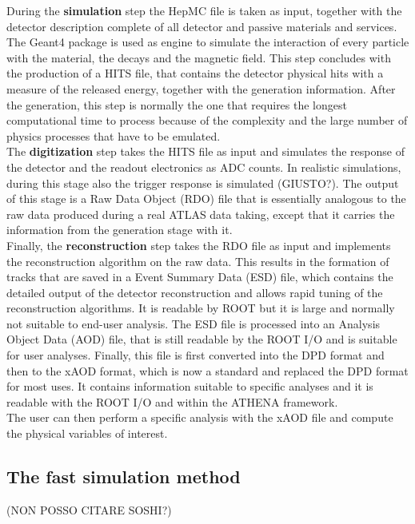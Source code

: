 \documentclass[a4paper,twoside,12pt]{article}
\begin{document}
During the \textbf{simulation} step the HepMC file is taken as input, together with
the detector description complete of all detector and passive materials and services. 
The Geant4 package\cite{Geant4} is used as
engine to simulate the interaction of every particle with the material, the decays and the
magnetic field. This
step concludes with the production of a HITS file, that contains the detector physical hits
with a measure of the released energy, together with the generation information. After
the generation, this step 
is normally the one that requires the longest computational time to process because of the
complexity and the large number of physics processes that have to be emulated.\\

The \textbf{digitization} step takes the HITS file as input and simulates the response of the 
detector and the readout electronics as ADC counts. In realistic simulations, during this
stage also the trigger response is simulated (GIUSTO?). The output of this stage is a Raw Data
Object (RDO) file that is essentially analogous to the raw data produced during a real 
ATLAS data taking, except that it carries the information from the generation stage with it.\\

Finally, the \textbf{reconstruction} step takes the RDO file as input and implements
the reconstruction algorithm on the raw data. This results in the formation of tracks that are saved in a Event Summary Data (ESD) file, which contains the detailed output
of the detector reconstruction and allows rapid tuning of the reconstruction algorithms. It is readable by ROOT but it is large and normally not suitable
to end-user analysis\cite{ATLASFormats}. The ESD file is processed into an Analysis Object Data (AOD) file, that is
still readable by the ROOT I/O and is suitable for user analyses.  Finally, this file is first
converted
into the DPD format and then to the xAOD format\cite{xAOD}, which is now a standard and replaced the DPD format for most uses. It contains 
information suitable to specific analyses and it is readable with the ROOT I/O and within the
ATHENA framework\cite{Athena}.\\

The user can then perform a specific analysis with the xAOD file and compute the physical
variables of interest.

\subsection{The fast simulation method}
(NON POSSO CITARE SOSHI?)
\end{document}
